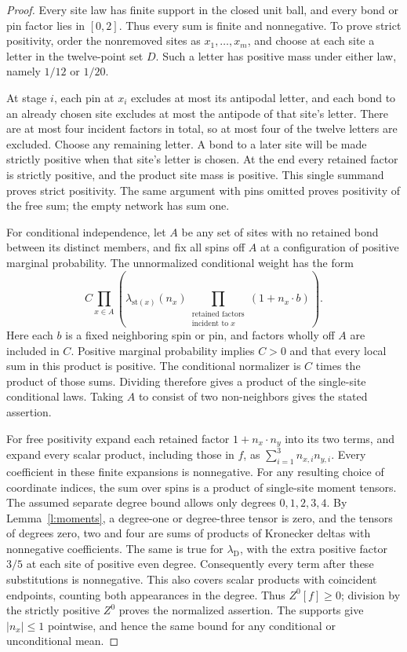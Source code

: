 \begin{proof}
Every site law has finite support in the closed unit ball, and every
bond or pin factor lies in \([0,2]\). Thus every sum is finite and
nonnegative. To prove strict positivity, order the nonremoved sites
as \(x_1,\ldots,x_m\), and choose at each site a letter in the
twelve-point set \(D\). Such a letter has positive mass under either
law, namely \(1/12\) or \(1/20\).

At stage \(i\), each pin at \(x_i\) excludes at most its antipodal
letter, and each bond to an already chosen site excludes at most the
antipode of that site's letter. There are at most four incident
factors in total, so at most four of the twelve letters are excluded.
Choose any remaining letter. A bond to a later site will be made
strictly positive when that site's letter is chosen. At the end every
retained factor is strictly positive, and the product site mass is
positive. This single summand proves strict positivity. The same
argument with pins omitted proves positivity of the free sum; the
empty network has sum one.

For conditional independence, let \(A\) be any set of sites with no
retained bond between its distinct members, and fix all spins off
\(A\) at a configuration of positive marginal probability. The
unnormalized conditional weight has the form
\[
 C\prod_{x\in A}
 \left(\lambda_{\mathrm{st}(x)}(n_x)
       \prod_{\substack{\text{retained factors}\\\text{incident to }x}}
                     (1+n_x\cdot b)\right).
\]
Here each \(b\) is a fixed neighboring spin or pin, and factors
wholly off \(A\) are included in \(C\). Positive marginal probability
implies \(C>0\) and that every local sum in this product is positive.
The conditional normalizer is \(C\) times the product of those sums.
Dividing therefore gives a product of the single-site conditional
laws. Taking \(A\) to consist of two non-neighbors gives the stated
assertion.

For free positivity expand each retained factor \(1+n_x\cdot n_y\)
into its two terms, and expand every scalar product, including those
in \(f\), as \(\sum_{i=1}^3n_{x,i}n_{y,i}\). Every coefficient in
these finite expansions is nonnegative. For any resulting choice
of coordinate indices, the sum over spins is a product of
single-site moment tensors. The assumed separate degree bound
allows only degrees \(0,1,2,3,4\).
By Lemma~\ref{l:moments}, a degree-one or degree-three tensor is zero,
and the tensors of degrees zero, two and four are sums of products
of Kronecker deltas with nonnegative coefficients.
The same is true for \(\lambda_{\mathrm D}\), with the extra
positive factor \(3/5\) at each site of positive even degree.
Consequently every term after these substitutions is nonnegative.
This also covers scalar products with coincident endpoints, counting
both appearances in the degree. Thus \(Z^0[f]\ge0\); division by the
strictly positive \(Z^0\) proves the normalized assertion.
The supports give \(|n_x|\le1\) pointwise, and hence the same bound
for any conditional or unconditional mean.
\end{proof}

